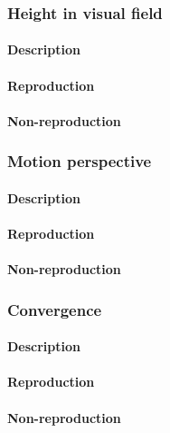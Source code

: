 \subsubsection{Height in visual field}
\paragraph{Description}

\paragraph{Reproduction}

\paragraph{Non-reproduction}


\subsubsection{Motion perspective}
\paragraph{Description}

\paragraph{Reproduction}

\paragraph{Non-reproduction}


\subsubsection{Convergence}
\paragraph{Description}

\paragraph{Reproduction}

\paragraph{Non-reproduction}


